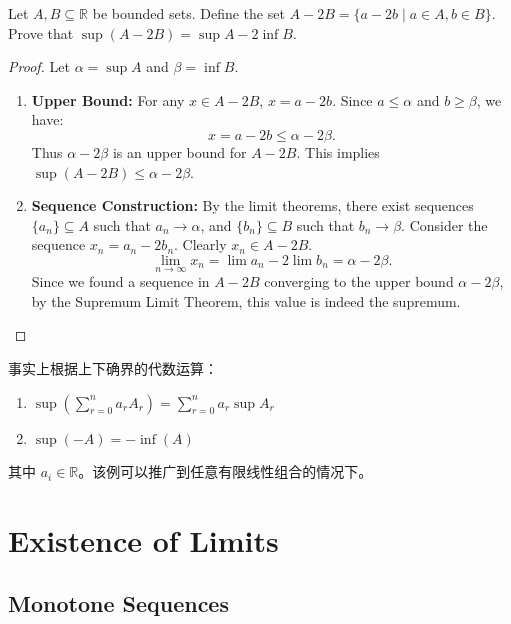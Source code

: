 \documentclass[
	UTF-8,
	11pt, %
	a4paper, %
]{LegrandOrangeBook}
\begin{document}
    \begin{example}
    Let $A, B \subseteq \mathbb{R}$ be bounded sets. Define the set $A - 2B = \{ a - 2b \mid a \in A, b \in B \}$.
    Prove that $\sup(A - 2B) = \sup A - 2 \inf B$.

    \begin{proof}
        Let $\alpha = \sup A$ and $\beta = \inf B$.
    \begin{enumerate}
        \item \textbf{Upper Bound:} For any $x \in A - 2B$, $x = a - 2b$.
        Since $a \le \alpha$ and $b \ge \beta$, we have:
        \[ x = a - 2b \le \alpha - 2\beta. \]
        Thus $\alpha - 2\beta$ is an upper bound for $A - 2B$. This implies $\sup(A-2B) \le \alpha - 2\beta$.

        \item \textbf{Sequence Construction:}
        By the limit theorems, there exist sequences $\{a_n\} \subseteq A$ such that $a_n \to \alpha$, and $\{b_n\} \subseteq B$ such that $b_n \to \beta$.
        Consider the sequence $x_n = a_n - 2b_n$. Clearly $x_n \in A - 2B$.
        \[ \lim_{n \to \infty} x_n = \lim a_n - 2 \lim b_n = \alpha - 2\beta. \]
        Since we found a sequence in $A-2B$ converging to the upper bound $\alpha - 2\beta$, by the Supremum Limit Theorem, this value is indeed the supremum.
    \end{enumerate}
    \end{proof}

    \begin{remark}
        事实上根据上下确界的代数运算：
        \begin{enumerate}
            \item $\displaystyle\sup\left( \sum_{r=0}^{n}a_r A_r \right) = \sum_{r=0}^{n}a_r \sup A_r $
            \item $\sup \left( -A \right) = -\inf\left( A \right) $
        \end{enumerate}
        其中 $a_i \in \mathbb{R}$。该例可以推广到任意有限线性组合的情况下。
    \end{remark}

    \end{example}

    \newpage

    \section{Existence of Limits}

            \subsection{Monotone Sequences}
\end{document}
